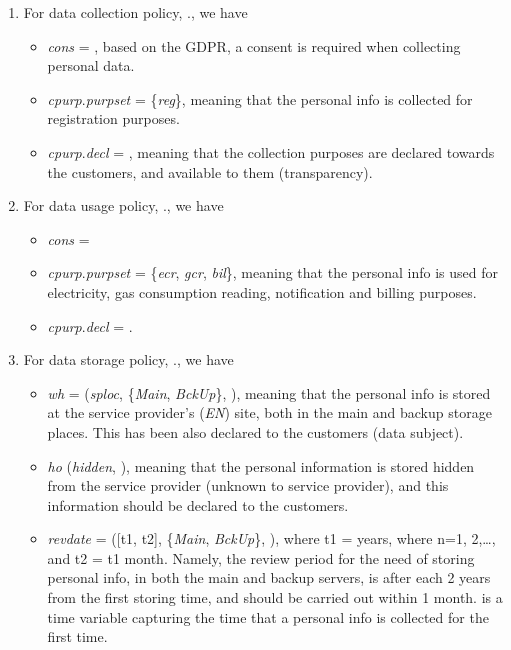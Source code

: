 \documentclass[a4paper]{article}
\begin{document}
\begin{enumerate}
\item For data collection policy, ., we have 
\begin{itemize}
\item \textit{cons} = , based on the GDPR, a consent is required when collecting personal data.  
\item  \textit{cpurp}.\textit{purpset} = \{\textit{reg}\}, meaning that the personal info is collected for registration purposes.  
\item \textit{cpurp}.\textit{decl} = , meaning that the collection purposes are declared towards the customers, and available to them (transparency).  
\end{itemize}

\item For data usage policy, ., we have 
\begin{itemize}
\item \textit{cons} =  
\item  \textit{cpurp}.\textit{purpset} = \{\textit{ecr}, \textit{gcr}, \textit{bil}\}, meaning that the personal info is used for electricity, gas consumption reading, notification and billing purposes. 
\item \textit{cpurp}.\textit{decl} = .  
\end{itemize}

\item For data storage policy, ., we have 
\begin{itemize} 
\item \textit{wh} = (\textit{sploc}, \{\textit{Main}, \textit{BckUp}\}, ), meaning that the personal info is stored at the service provider's (\textit{EN}) site, both in the main and backup storage places. This has been also declared to the customers (data subject).     

\item \textit{ho}  (\textit{hidden}, ), meaning that the personal information is stored hidden from the service provider (unknown to service provider), and this information should be declared to the customers. 

\item \textit{revdate} = ([t1, t2], \{\textit{Main}, \textit{BckUp}\}, ), where t1 =      years, where n={1, 2,\dots,} and t2 = t1   month. Namely, the review period for the need of storing personal info, in both the main and backup servers, is  after each 2 years from the first storing time, and should be carried out within 1 month.  is a time variable capturing the time that a personal info is collected for the first time.
\end{itemize}   


\end{enumerate}
\end{document}
